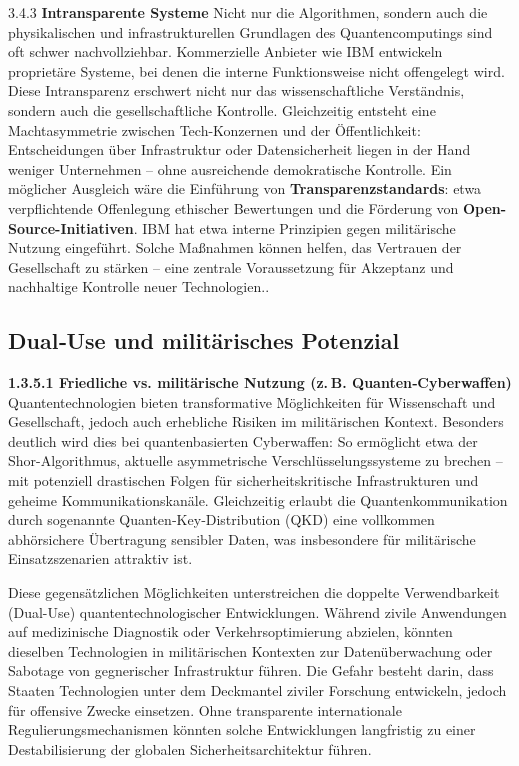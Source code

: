3.4.3 \textbf{Intransparente Systeme }
Nicht nur die Algorithmen, sondern auch die physikalischen und infrastrukturellen Grundlagen des Quantencomputings sind oft schwer nachvollziehbar. Kommerzielle Anbieter wie IBM entwickeln proprietäre Systeme, bei denen die interne Funktionsweise nicht offengelegt wird. Diese Intransparenz erschwert nicht nur das wissenschaftliche Verständnis, sondern auch die gesellschaftliche Kontrolle.\cite{noauthor_defining_nodate}
Gleichzeitig entsteht eine Machtasymmetrie zwischen Tech-Konzernen und der Öffentlichkeit: Entscheidungen über Infrastruktur oder Datensicherheit liegen in der Hand weniger Unternehmen – ohne ausreichende demokratische Kontrolle.\cite{noauthor_ethics_nodate}
Ein möglicher Ausgleich wäre die Einführung von \textbf{Transparenzstandards}: etwa verpflichtende Offenlegung ethischer Bewertungen und die Förderung von \textbf{Open-Source-Initiativen}. IBM hat etwa interne Prinzipien gegen militärische Nutzung eingeführt.\cite{noauthor_defining_nodate} Solche Maßnahmen können helfen, das Vertrauen der Gesellschaft zu stärken – eine zentrale Voraussetzung für Akzeptanz und nachhaltige Kontrolle neuer Technologien.\cite{noauthor_quantum_nodate}.
 
\subsection{Dual‑Use und militärisches Potenzial}
\textbf{1.3.5.1 \textbf{Friedliche vs. militärische Nutzung (z. B. Quanten‑Cyberwaffen)} }
Quantentechnologien bieten transformative Möglichkeiten für Wissenschaft und Gesellschaft, jedoch auch erhebliche Risiken im militärischen Kontext. Besonders deutlich wird dies bei quantenbasierten Cyberwaffen: So ermöglicht etwa der Shor-Algorithmus, aktuelle asymmetrische Verschlüsselungssysteme zu brechen – mit potenziell drastischen Folgen für sicherheitskritische Infrastrukturen und geheime Kommunikationskanäle\cite{krelina_quantum_2021}. Gleichzeitig erlaubt die Quantenkommunikation durch sogenannte Quanten‑Key‑Distribution (QKD) eine vollkommen abhörsichere Übertragung sensibler Daten, was insbesondere für militärische Einsatzszenarien attraktiv ist\cite{neumann_quantum_2020}.

Diese gegensätzlichen Möglichkeiten unterstreichen die doppelte Verwendbarkeit (Dual-Use) quantentechnologischer Entwicklungen. Während zivile Anwendungen auf medizinische Diagnostik oder Verkehrsoptimierung abzielen, könnten dieselben Technologien in militärischen Kontexten zur Datenüberwachung oder Sabotage von gegnerischer Infrastruktur führen. Die Gefahr besteht darin, dass Staaten Technologien unter dem Deckmantel ziviler Forschung entwickeln, jedoch für offensive Zwecke einsetzen. Ohne transparente internationale Regulierungsmechanismen könnten solche Entwicklungen langfristig zu einer Destabilisierung der globalen Sicherheitsarchitektur führen.


